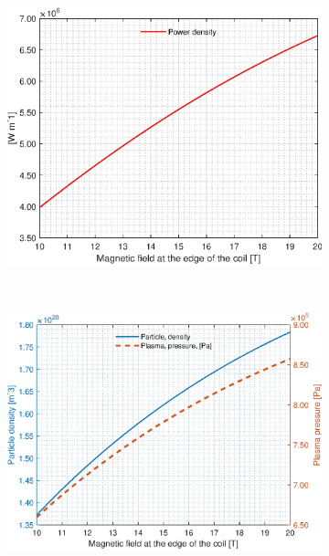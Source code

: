 \begin{figure}[H]
	\begin{subfigure}[h!]{.45\textwidth}
		\includegraphics[width=\textwidth]{MatlabFigures/Bmax/f5.eps}
	\end{subfigure}
	~
	\begin{subfigure}[h!]{.45\textwidth}
		\includegraphics[width=\textwidth]{MatlabFigures/Bmax/f6.eps}
	\end{subfigure}


\end{figure}
